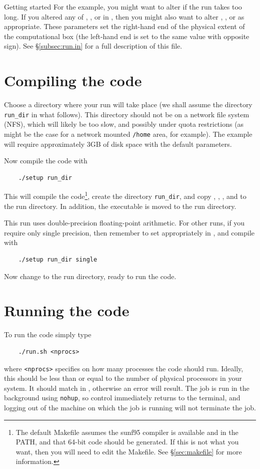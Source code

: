 \begin{chapter}{\label{cha:quickstart}Getting started}
  For the  example, you might want to alter
   if the run takes too long.  If you altered any of
  , , or  in , then you
  might also want to alter , , or  as
  appropriate.  These parameters set the right-hand end of the physical extent
  of the computational box (the left-hand end is set to the same value with
  opposite sign).  See \S\ref{subsec:run.in} for a full description of this
  file.

  \section{Compiling the code}
  Choose a directory where your run will take place (we shall assume the
  directory \verb"run_dir" in what follows).  This directory should not be on a
  network file system (NFS), which will likely be too slow, and possibly under
  quota restrictions (as might be the case for a network mounted \verb"/home"
  area, for example).  The  example will require approximately
  3GB of disk space with the default parameters.

  Now compile the code with
  \begin{Verbatim}
    ./setup run_dir
  \end{Verbatim}
  This will compile the code\footnote{The default Makefile assumes the sunf95
  compiler is available and in the PATH, and that 64-bit code should be
  generated.  If this is not what you want, then you will need to edit the
  Makefile.  See \S\ref{sec:makefile} for more information.}, create the
  directory \verb"run_dir", and copy , ,
  , and  to the run directory.  In addition,
  the executable  is moved to the run directory.

  This run uses double-precision floating-point arithmetic.  For other runs, if
  you require only single precision, then remember to set 
  appropriately in , and compile with
  \begin{Verbatim}
    ./setup run_dir single
  \end{Verbatim}
  Now change to the run directory, ready to run the code.

  \section{Running the code}
  To run the code simply type
  \begin{Verbatim}
    ./run.sh <nprocs>
  \end{Verbatim}
  where \verb"<nprocs>" specifies on how many processes the code should run.
  Ideally, this should be less than or equal to the number of physical
  processors in your system.  It should match  in
  , otherwise an error will result.  The job is run in
  the background using \verb"nohup", so control immediately returns to the
  terminal, and logging out of the machine on which the job is running will not
  terminate the job.


\end{chapter}
